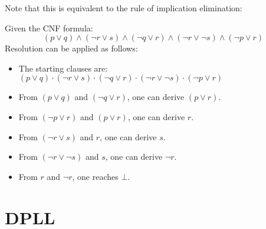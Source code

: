 \begin{description}
\begin{descriptionlist}
                Note that this is equivalent to the rule of implication elimination:\\
                \begin{minipage}{0.4\linewidth}
                    \begin{prooftree}
                    \end{prooftree}
                \end{minipage}
                \begin{minipage}{0.4\linewidth}
                    \begin{prooftree}
                    \end{prooftree}
                \end{minipage}
        \end{descriptionlist}
\end{description}

\begin{example}
    Given the CNF formula:
    \[ (p \vee q) \land (\lnot r \vee s) \land (\lnot q \vee r) \land (\lnot r \vee \lnot s) \land (\lnot p \vee r) \]
    Resolution can be applied as follows:
    \begin{itemize}
        \item The starting clauses are:
            $(p \vee q) \cdot (\lnot r \vee s) \cdot (\lnot q \vee r) \cdot (\lnot r \vee \lnot s) \cdot (\lnot p \vee r)$
        \item From $(p \vee q)$ and $(\lnot q \vee r)$, one can derive $(p \vee r)$.
        \item From $(\lnot p \vee r)$ and $(p \vee r)$, one can derive $r$.
        \item From $(\lnot r \vee s)$ and $r$, one can derive $s$.
        \item From $(\lnot r \vee \lnot s)$ and $s$, one can derive $\lnot r$.
        \item From $r$ and $\lnot r$, one reaches $\bot$.
    \end{itemize}
\end{example}



\section{DPLL}

